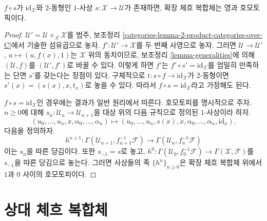 \begin{lemma}
\label{lemma-homotopy}
$f \circ s$가 $\text{id}_\mathcal{X}$와 $2$-동형인 $1$-사상
$s : \mathcal{X} \to \mathcal{U}$가 존재하면,
확장 체흐 복합체는 영과 호모토픽이다.
\end{lemma}

\begin{proof}
$\mathcal{U}' = \mathcal{U} \times_\mathcal{X} \mathcal{X}$를
범주, 보조정리 \ref{categories-lemma-2-product-categories-over-C}에서
기술한 섬유곱으로 놓자.
$f' : \mathcal{U}' \to \mathcal{X}$를 두 번째 사영으로 놓자.
그러면
$\mathcal{U} \to \mathcal{U}'$, $u \mapsto (u, f(x), 1)$는
$\mathcal{X}$ 위의 동치이므로, 보조정리 \ref{lemma-generalities}에 의해
$(\mathcal{U}, f)$를 $(\mathcal{U}', f')$로 바꿀 수 있다.
이렇게 하면 $f'$는 $f' \circ s' = \text{id}_\mathcal{X}$를 엄밀히
만족하는 단면 $s'$를 갖는다는 장점이 있다. 구체적으로
$t : s \circ f \to \text{id}_\mathcal{X}$가 $2$-동형이면
$s'(x) = (s(x), x, t_x)$로 놓을 수 있다.
따라서 $f \circ s = \text{id}_\mathcal{X}$라고 가정해도 된다.

\medskip\noindent
$f \circ s = \text{id}_\mathcal{X}$인 경우에는 결과가 일반 원리에서
따른다. 호모토피를 명시적으로 주자. $n \geq 0$에 대해
$s_n : \mathcal{U}_n \to \mathcal{U}_{n + 1}$을 대상 위의
다음 규칙으로 정의된 $1$-사상이라 하자.
$$
(u_0, \ldots, u_n, x, \alpha_0, \ldots, \alpha_n)
\longmapsto
(u_0, \ldots, u_n, s(x), x,
\alpha_0, \ldots, \alpha_n, \text{id}_x).
$$
다음을 정의하자.
$$
h^{n + 1} :
\Gamma(\mathcal{U}_{n + 1}, f_{n + 1}^{-1}\mathcal{F})
\longrightarrow
\Gamma(\mathcal{U}_n, f_n^{-1}\mathcal{F})
$$
이는 $s_n$을 따른 당김이다. 또한 $s_{-1} = s$로 놓고,
$h^0 : \Gamma(\mathcal{U}_0, f_0^{-1}\mathcal{F}) \to
\Gamma(\mathcal{X}, \mathcal{F})$를 $s_{-1}$을 따른 당김으로 놓는다.
그러면 사상들의 족 $\{h^n\}_{n \geq 0}$은 확장 체흐 복합체 위에서
$1$과 $0$ 사이의 호모토피이다.
\end{proof}









\section{상대 체흐 복합체}
\label{section-sheaf-cech-complex}

